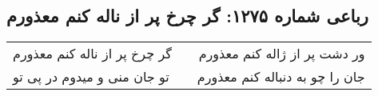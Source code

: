 \begin{center}
\section*{رباعی شماره ۱۲۷۵: گر چرخ پر از ناله کنم معذورم}
\label{sec:1275}
\begin{longtable}{l p{0.5cm} r}
گر چرخ پر از ناله کنم معذورم
&&
ور دشت پر از ژاله کنم معذورم
\\
تو جان منی و میدوم در پی تو
&&
جان را چو به دنباله کنم معذورم
\\
\end{longtable}
\end{center}
